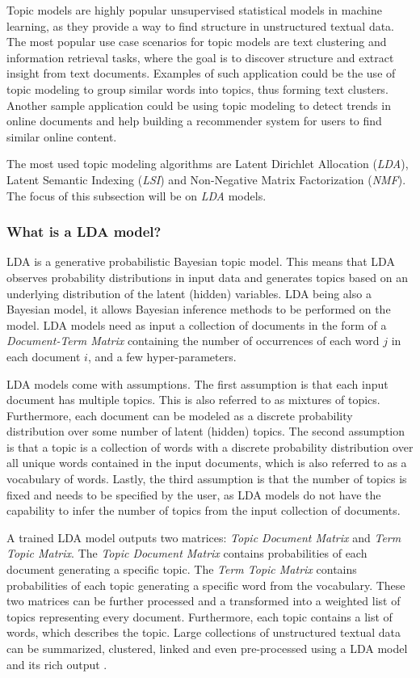         Topic models are highly popular unsupervised statistical models in machine learning, as they provide a way to find structure in unstructured textual data. The most popular use case scenarios for topic models are text clustering and information retrieval tasks, where the goal is to discover structure and extract insight from text documents. Examples of such application could be the use of topic modeling to group similar words into topics, thus forming text clusters. Another sample application could be using topic modeling to detect trends in online documents and help building a recommender system for users to find similar online content. 
        
        The most used topic modeling algorithms are Latent Dirichlet Allocation (\emph{LDA}), Latent Semantic Indexing (\emph{LSI}) and Non-Negative Matrix Factorization (\emph{NMF}). The focus of this subsection will be on \emph{LDA} models.
    
        \subsubsection{What is a LDA model?}
            
           LDA is a generative probabilistic Bayesian topic model. This means that LDA observes probability distributions in input data and generates topics based on an underlying distribution of the latent (hidden) variables. LDA being also a Bayesian model, it allows Bayesian inference methods to be performed on the model. LDA models need as input a collection of documents in the form of a \emph{Document-Term Matrix} containing the number of occurrences of each word $j$ in each document $i$, and a few hyper-parameters. 
           
           LDA models come with assumptions. The first assumption is that each input document has multiple topics. This is also referred to as mixtures of topics. Furthermore, each document can be modeled as a discrete probability distribution over some number of latent (hidden) topics. The second assumption is that a topic is a collection of words with a discrete probability distribution over all unique words contained in the input documents, which is also referred to as a vocabulary of words. Lastly, the third assumption is that the number of topics is fixed and needs to be specified by the user, as LDA models do not have the capability to infer the number of topics from the input collection of documents.
           
            A trained LDA model outputs two matrices: \emph{Topic Document Matrix} and \emph{Term Topic Matrix}. The \emph{Topic Document Matrix} contains probabilities of each document generating a specific topic. The \emph{Term Topic Matrix} contains probabilities of each topic generating a specific word from the vocabulary. These two matrices can be further processed and a transformed into a weighted list of topics representing every document. Furthermore, each topic contains a list of words, which describes the topic. Large collections of unstructured textual data can be summarized, clustered, linked and even pre-processed using a LDA model and its rich output \cite{campbell2015latent}.
        
